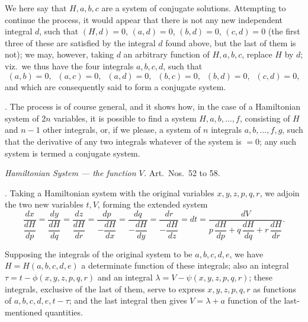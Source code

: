 \documentclass[11pt,a4paper]{article}
\begin{document}
We here say that $H, a, b, c$ are a system of conjugate solutions. Attempting to continue the process, it would appear that there is not any new independent integral $d$, such that $(H, d) = 0$, $(a, d) = 0$, $(b, d) = 0$, $(c, d) = 0$ (the first three of these are satisfied by the integral $d$ found above, but the last of them is not); we may, however, taking $d$ an arbitrary function of $H, a, b, c$, replace $H$ by $d$; viz.\ we thus have the four integrals $a, b, c, d$, such that
\[
(a, b) = 0, \;\; (a, c) = 0, \;\; (a, d) = 0, \;\; (b, c) = 0, \;\; (b, d) = 0, \;\; (c, d) = 0,
\]
and which are consequently said to form a conjugate system.

\medskip

. The process is of course general, and it shows how, in the case of a Hamiltonian system of $2n$ variables, it is possible to find a system $H, a, b, \ldots, f$, consisting of $H$ and $n - 1$ other integrals, or, if we please, a system of $n$ integrals $a, b, \ldots, f, g$, such that the derivative of any two integrals whatever of the system is $= 0$; any such system is termed a conjugate system.

\bigskip

\begin{center}
\emph{Hamiltonian System --- the function $V$.} Art.\ Nos.\ 52 to 58.
\end{center}

\medskip

. Taking a Hamiltonian system with the original variables $x, y, z, p, q, r$, we adjoin the two new variables $t, V$, forming the extended system
\[
\frac{dx}{\dfrac{dH}{dp}} = \frac{dy}{\dfrac{dH}{dq}} = \frac{dz}{\dfrac{dH}{dr}} = \frac{dp}{-\dfrac{dH}{dx}} = \frac{dq}{-\dfrac{dH}{dy}} = \frac{dr}{-\dfrac{dH}{dz}} = dt = \frac{dV}{p\,\dfrac{dH}{dp} + q\,\dfrac{dH}{dq} + r\,\dfrac{dH}{dr}}.
\]

Supposing the integrals of the original system to be $a, b, c, d, e$, we have $H = H(a, b, c, d, e)$ a determinate function of these integrals; also an integral $\tau = t - \phi(x, y, z, p, q, r)$ and an integral $\lambda = V - \psi(x, y, z, p, q, r)$; these integrals, exclusive of the last of them, serve to express $x, y, z, p, q, r$ as functions of $a, b, c, d, e, t - \tau$; and the last integral then gives $V = \lambda + a$ function of the last-mentioned quantities.

\newpage

\end{document}
